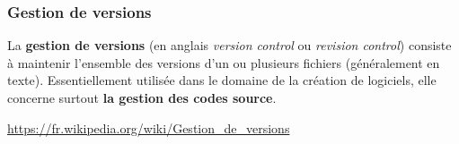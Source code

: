 \documentclass[table,tikz,12pt,svgnames]{beamer}
\begin{document}
\begin{frame}
	\frametitle{Gestion de versions}
		\begin{block}{}
				La \textbf{gestion de versions} (en anglais \textit{version control} ou \textit{revision control}) consiste à maintenir l'ensemble des versions d'un ou plusieurs fichiers (généralement en texte).
				Essentiellement utilisée dans le domaine de la création de logiciels, elle concerne surtout \textbf{la gestion des codes source}.
		\end{block}
		\begin{block}{}
		\small \url{https://fr.wikipedia.org/wiki/Gestion\_de\_versions}
		\end{block}
\end{frame}
\end{document}
